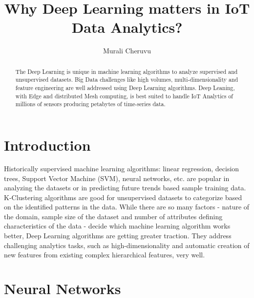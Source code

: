\documentclass[sigconf]{acmart}
\begin{document}
	\title{Why Deep Learning matters in IoT Data Analytics?}
	
	
	\author{Murali Cheruvu}
	
	\renewcommand{\shortauthors}{M. Cheruvu}
	
	
	\begin{abstract}
		
	The Deep Learning is unique in machine learning algorithms to analyze supervised and unsupervised datasets. Big Data challenges like high volumes, multi-dimensionality and feature engineering are well addressed using Deep Learning algorithms. Deep Leaning, with Edge and distributed Mesh computing, is best suited to handle IoT Analytics of millions of sensors producing petabytes of time-series data.
		
	\end{abstract}
	
	
	\maketitle
	

	
	\section{Introduction}		

	Historically supervised machine learning algorithms: linear regression, decision trees, Support Vector Machine (SVM), neural networks, etc. are popular in analyzing the datasets or in predicting future trends based sample training data. K-Clustering algorithms are good for unsupervised datasets to categorize based on the identified patterns in the data. While there are so many factors - nature of the domain, sample size of the dataset and number of attributes defining characteristics of the data - decide which machine learning algorithm works better, Deep Learning algorithms are getting greater traction. They address challenging analytics tasks, such as high-dimensionality and automatic creation of new features from existing complex hierarchical features, very well. 
		
	\section{Neural Networks}
	
\end{document}
